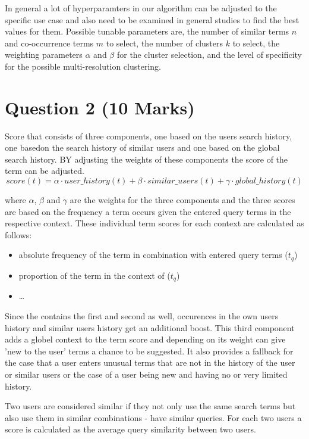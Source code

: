 In general a lot of hyperparamters in our algorithm can be adjusted to the specific use case and also need to be examined in general studies to find the best values for them. Possible tunable parameters are, the number of similar terms $n$ and co-occurrence terms $m$ to select, the number of clusters $k$ to select, the weighting parameters $\alpha$ and $\beta$ for the cluster selection, and the level of specificity for the possible multi-resolution clustering.


\newpage
\section{Question 2 (10 Marks)}

Score that consists of three components, one based on the users search history, one basedon the search history of similar users and one based on the global search history. BY adjusting the weights of these components the score of the term can be adjusted.
$$score(t) = \alpha \cdot user\_history(t) + \beta \cdot similar\_users(t) + \gamma \cdot global\_history(t)$$

where $\alpha$, $\beta$ and $\gamma$ are the weights for the three components and the three scores are based on the frequency a term occurs given the entered query terms in the respective context.
These individual term scores for each context are calculated as follows:

\begin{itemize}
    \item absolute frequency of the term in combination with entered query terms ($t_q$)
    \item proportion of the term in the context of ($t_q$)
    \item \dots
\end{itemize}

Since the contains the first and second as well, occurences in the own users history and similar users history get an additional boost. %
This third component adds a globel context to the term score and depending on its weight can give 'new to the user' terms a chance to be suggested.
It also provides a fallback for the case that a user enters unusual terms that are not in the history of the user or similar users or the case of a user being new and having no or very limited history.



Two users are considered similar if they not only use the same search terms but also use them in similar combinations - have similar queries.
For each two users a score is calculated as the average query similarity between two users.

